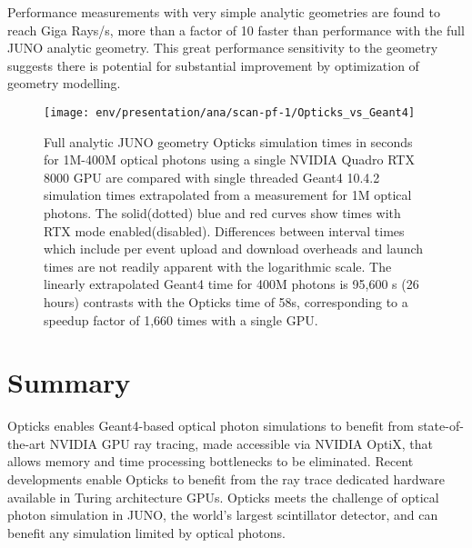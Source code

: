 \documentclass{webofc}
\begin{document}
Performance measurements with very simple analytic geometries are found to reach Giga Rays/s, 
more than a factor of 10 faster than performance with the full JUNO analytic geometry. 
This great performance sensitivity to the geometry suggests there is potential for 
substantial improvement by optimization of geometry modelling. 
%
\begin{figure}
\centering
\texttt{[image: env/presentation/ana/scan-pf-1/Opticks\_vs\_Geant4]}
\caption{Full analytic JUNO geometry Opticks simulation times in seconds for 1M-400M optical photons using a single NVIDIA Quadro RTX 8000 GPU 
are compared with single threaded Geant4 10.4.2 simulation times extrapolated from a measurement for 1M optical photons. 
The solid(dotted) blue and red curves show times with RTX mode enabled(disabled). 
Differences between interval times which include per event upload and download overheads and launch 
times are not readily apparent with the logarithmic scale. The linearly extrapolated Geant4 time for 400M photons is 95,600 s (26 hours) 
contrasts with the Opticks time of 58s, corresponding to a speedup factor of 1,660 times with a single GPU.   
}
\label{scanpf1vs} 
\end{figure}
%
%
%
\section{Summary}
%
Opticks enables Geant4-based optical photon simulations to benefit from 
state-of-the-art NVIDIA GPU ray tracing, made accessible via NVIDIA OptiX,
that allows memory and time processing bottlenecks to be eliminated.
Recent developments enable Opticks to benefit from the ray trace dedicated 
hardware available in Turing architecture GPUs.
Opticks meets the challenge of optical photon simulation in JUNO, 
the world's largest scintillator detector, and can benefit any simulation limited by optical photons. 
%
%
%
\end{document}
